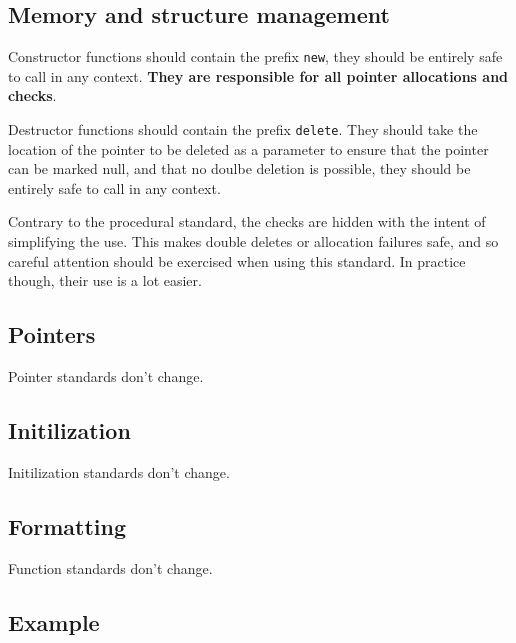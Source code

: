 \documentclass{article}
\begin{document}
\subsection{Memory and structure management}
Constructor functions should contain the prefix \texttt{new}, they should be entirely safe to call in any context. \textbf{They are responsible for all pointer allocations and checks}.

Destructor functions should contain the prefix \texttt{delete}. They should take the location of the pointer to be deleted as a parameter to ensure that the pointer can be marked null, and that no doulbe deletion is possible, they should be entirely safe to call in any context.

Contrary to the procedural standard, the checks are hidden with the intent of simplifying the use. This makes double deletes or allocation failures safe, and so careful attention should be exercised when using this standard. In practice though, their use is a lot easier.

\subsection{Pointers}
Pointer standards don't change.

\subsection{Initilization}
Initilization standards don't change.

\subsection{Formatting}
Function standards don't change.

\pagebreak

\subsection{Example}
\end{document}
